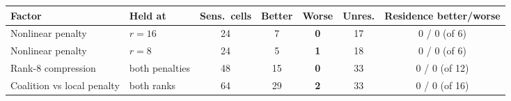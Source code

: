 \begin{tabular}{@{}llccccc@{}}
\toprule
Factor & Held at & Sens.\ cells & Better & Worse & Unres. & Residence better/worse \\
\midrule
Nonlinear penalty & $r=16$ & 24 & 7 & \textbf{0} & 17 & 0 / 0 (of 6) \\
Nonlinear penalty & $r=8$ & 24 & 5 & \textbf{1} & 18 & 0 / 0 (of 6) \\
Rank-8 compression & both penalties & 48 & 15 & \textbf{0} & 33 & 0 / 0 (of 12) \\
Coalition vs local penalty & both ranks & 64 & 29 & \textbf{2} & 33 & 0 / 0 (of 16) \\
\bottomrule
\end{tabular}
